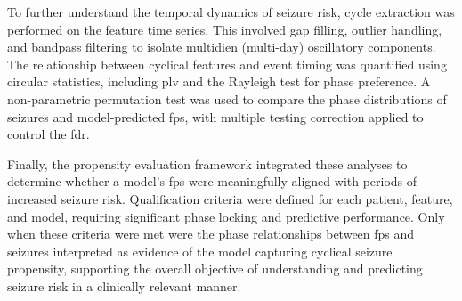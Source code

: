 To further understand the temporal dynamics of seizure risk, cycle extraction was performed on the feature time series.
This involved gap filling, outlier handling, and bandpass filtering to isolate multidien (multi-day) oscillatory components.
The relationship between cyclical features and event timing was quantified using circular statistics, including \gls{plv} and the Rayleigh test for phase preference.
A non-parametric permutation test was used to compare the phase distributions of seizures and model-predicted \glspl{fp}, with multiple testing correction applied to control the \gls{fdr}.

Finally, the propensity evaluation framework integrated these analyses to determine whether a model’s \glspl{fp} were meaningfully aligned with periods of increased seizure risk.
Qualification criteria were defined for each patient, feature, and model, requiring significant phase locking and predictive performance.
Only when these criteria were met were the phase relationships between \glspl{fp} and seizures interpreted as evidence of the model capturing cyclical seizure propensity, supporting the overall objective of understanding and predicting seizure risk in a clinically relevant manner.
